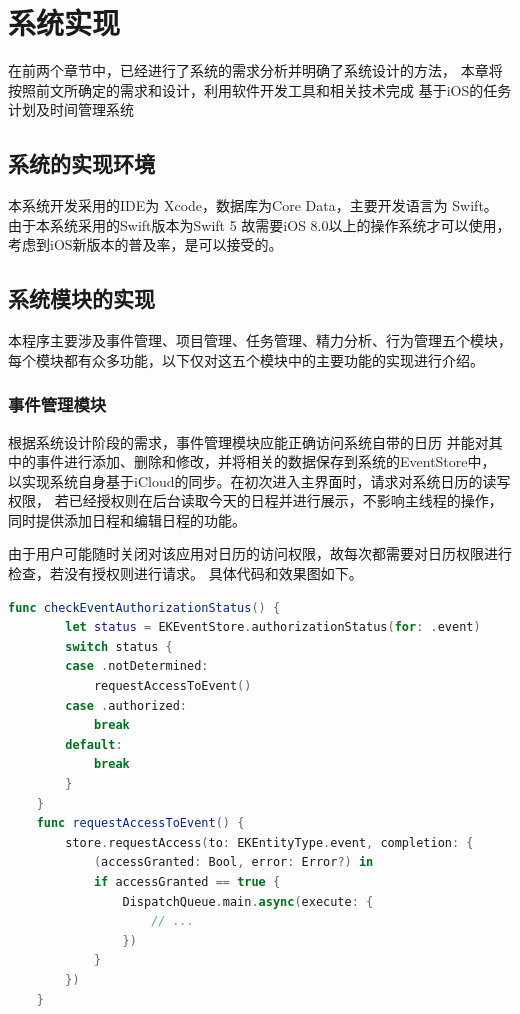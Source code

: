 
\chapter{系统实现}

在前两个章节中，已经进行了系统的需求分析并明确了系统设计的方法，
本章将按照前文所确定的需求和设计，利用软件开发工具和相关技术完成
基于iOS的任务计划及时间管理系统

\section{系统的实现环境}
本系统开发采用的IDE为 Xcode，数据库为Core Data，主要开发语言为 Swift。
由于本系统采用的Swift版本为Swift 5 故需要iOS 8.0以上的操作系统才可以使用，
考虑到iOS新版本的普及率，是可以接受的。

\section{系统模块的实现}
本程序主要涉及事件管理、项目管理、任务管理、精力分析、行为管理五个模块，
每个模块都有众多功能，以下仅对这五个模块中的主要功能的实现进行介绍。

\subsection{事件管理模块}
根据系统设计阶段的需求，事件管理模块应能正确访问系统自带的日历
并能对其中的事件进行添加、删除和修改，并将相关的数据保存到系统的EventStore中，
以实现系统自身基于iCloud的同步。在初次进入主界面时，请求对系统日历的读写权限，
若已经授权则在后台读取今天的日程并进行展示，不影响主线程的操作，同时提供添加日程和编辑日程的功能。

由于用户可能随时关闭对该应用对日历的访问权限，故每次都需要对日历权限进行检查，若没有授权则进行请求。
具体代码和效果图如下。

\begin{lstlisting}[language={Swift}, caption={请求日历权限代码逻辑}]
	func checkEventAuthorizationStatus() {
		let status = EKEventStore.authorizationStatus(for: .event)
		switch status {
		case .notDetermined:
			requestAccessToEvent()
		case .authorized:
			break
		default:
			break
		}
	}
	func requestAccessToEvent() {
		store.requestAccess(to: EKEntityType.event, completion: {
			(accessGranted: Bool, error: Error?) in
			if accessGranted == true {
				DispatchQueue.main.async(execute: {
					// ...
				})
			}
		})
	}
\end{lstlisting}

